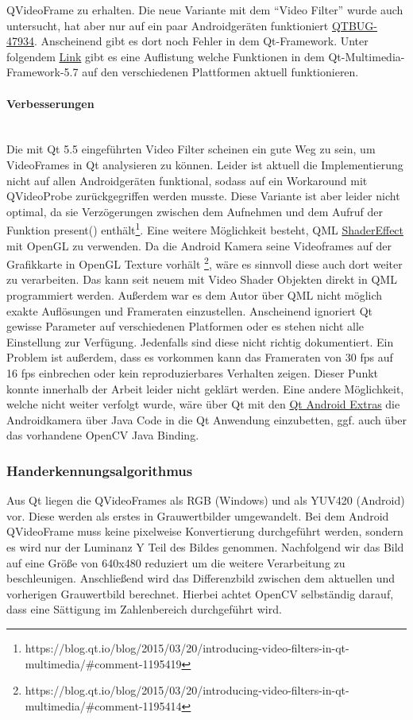 QVideoFrame zu erhalten. Die neue Variante mit dem "`Video Filter"' wurde auch untersucht, hat aber nur auf ein paar Androidgeräten funktioniert \href{https://bugreports.qt.io/browse/QTBUG-47934/}{QTBUG-47934}. Anscheinend gibt es dort noch Fehler in dem Qt-Framework. Unter folgendem \href{https://wiki.qt.io/Qt_5.7_Multimedia_Backends}{Link} gibt es eine Auflistung welche Funktionen in dem Qt-Multimedia-Framework-5.7 auf den verschiedenen Plattformen aktuell funktionieren.

\paragraph{Verbesserungen}$\;$\\
Die mit Qt 5.5 eingeführten Video Filter scheinen ein gute Weg zu sein, um VideoFrames in Qt analysieren zu können. Leider ist aktuell die Implementierung nicht auf allen Androidgeräten funktional, sodass auf ein Workaround mit QVideoProbe zurückgegriffen werden musste. Diese Variante ist aber leider nicht optimal, da sie Verzögerungen zwischen dem Aufnehmen und dem Aufruf der Funktion present() enthält\footnote{https://blog.qt.io/blog/2015/03/20/introducing-video-filters-in-qt-multimedia/\#comment-1195419}. Eine weitere Möglichkeit besteht, QML \href{http://doc.qt.io/qt-5/qml-qtquick-shadereffect.html}{ShaderEffect} mit OpenGL zu verwenden. Da die Android Kamera seine Videoframes auf der Grafikkarte in OpenGL Texture vorhält \footnote{https://blog.qt.io/blog/2015/03/20/introducing-video-filters-in-qt-multimedia/\#comment-1195414}, wäre es sinnvoll diese auch dort weiter zu verarbeiten. Das kann seit neuem mit Video Shader Objekten direkt in QML programmiert werden. Außerdem war es dem Autor über QML nicht möglich exakte Auflösungen und Frameraten einzustellen. Anscheinend ignoriert Qt gewisse Parameter auf verschiedenen Platformen oder es stehen nicht alle Einstellung zur Verfügung. Jedenfalls sind diese nicht richtig dokumentiert. Ein Problem ist außerdem, dass es vorkommen kann das Frameraten von 30 fps auf 16 fps einbrechen oder kein reproduzierbares Verhalten zeigen. Dieser Punkt konnte innerhalb der Arbeit leider nicht geklärt werden. Eine andere Möglichkeit, welche nicht weiter verfolgt wurde, wäre über Qt mit den \href{http://doc.qt.io/qt-5/qtandroidextras-module.html}{Qt Android Extras} die Androidkamera über Java Code in die Qt Anwendung einzubetten, ggf. auch über das vorhandene OpenCV Java Binding. 

\subsubsection{Handerkennungsalgorithmus}
Aus Qt liegen die QVideoFrames als RGB (Windows) und als YUV420 (Android) vor. Diese werden als erstes in Grauwertbilder umgewandelt. Bei dem Android QVideoFrame muss keine pixelweise Konvertierung durchgeführt werden, sondern es wird nur der Luminanz Y Teil des Bildes genommen. Nachfolgend wir das Bild auf eine Größe von 640x480 reduziert um die weitere Verarbeitung zu beschleunigen. Anschließend wird das Differenzbild zwischen dem aktuellen und vorherigen Grauwertbild berechnet. Hierbei achtet OpenCV selbständig darauf, dass eine Sättigung im Zahlenbereich durchgeführt wird.

